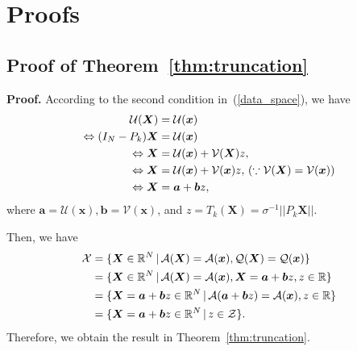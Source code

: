 \section{Proofs}
\label{app:proofs}

\subsection{Proof of Theorem~\ref{thm:truncation}}
\label{app:proofs:truncation}
\textbf{Proof.}
According to the second condition in~(\ref{data_space}), we have 
\begin{align}
  \mathcal{U}(\bm{X}) &= \mathcal{U}(\bm{x}) \notag \\
  \Leftrightarrow (I_{N} - P_k) \bm{X} &= \mathcal{U}(\bm{x}) \notag \\
  \Leftrightarrow \bm{X} &= \mathcal{U}(\bm{x}) + \mathcal{V}(\bm{X}) z, \notag \\
  \Leftrightarrow \bm{X} &= \mathcal{U}(\bm{x}) + \mathcal{V}(\bm{x}) z, \, (\because \mathcal{V}(\bm{X}) = \mathcal{V}(\bm{x})) \notag \\
  \Leftrightarrow \bm{X} &= \bm{a} + \bm{b} z, \notag 
\end{align}
where $\bm{a} = \mathcal{U}(\bm{x}), \bm{b} = \mathcal{V}(\bm{x})$, and $z = T_k(\bm{X}) = \sigma^{-1} ||P_k \bm{X}||$. 

Then, we have
\begin{align}
  \mathcal{X} 
  &= \{\bm{X} \in \mathbb{R}^N \, | \, \mathcal{A}(\bm{X}) = \mathcal{A}(\bm{x}), \mathcal{Q}(\bm{X}) =\mathcal{Q}(\bm{x})\} \notag \\
  &= \{\bm{X} \in \mathbb{R}^N \, | \, \mathcal{A}(\bm{X}) = \mathcal{A}(\bm{x}), \bm{X} = \bm{a} + \bm{b} z, z \in \mathbb{R}\} \notag \\
  &= \{\bm{X} = \bm{a} + \bm{b} z \in \mathbb{R}^N \, | \, \mathcal{A}(\bm{a} + \bm{b} z) = \mathcal{A}(\bm{x}), z \in \mathbb{R}\} \notag \\
  &= \{\bm{X} = \bm{a} + \bm{b} z \in \mathbb{R}^N \, | \, z \in \mathcal{Z} \}. \notag 
\end{align}
Therefore, we obtain the result in Theorem~\ref{thm:truncation}. 

